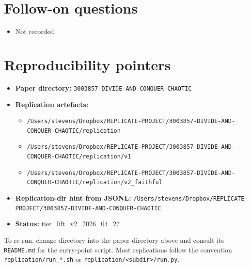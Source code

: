 \documentclass[11pt]{article}
\begin{document}
\section{Follow-on questions}
\begin{itemize}
\item Not recorded.
\end{itemize}

\section{Reproducibility pointers}\label{sec:repro}
\begin{itemize}
\item \textbf{Paper directory:} \texttt{3003857-DIVIDE-AND-CONQUER-CHAOTIC}
\item \textbf{Replication artefacts:}
\begin{itemize}
\item \texttt{/Users/stevens/Dropbox/REPLICATE-PROJECT/3003857-DIVIDE-AND-CONQUER-CHAOTIC/replication}
\item \texttt{/Users/stevens/Dropbox/REPLICATE-PROJECT/3003857-DIVIDE-AND-CONQUER-CHAOTIC/replication/v1}
\item \texttt{/Users/stevens/Dropbox/REPLICATE-PROJECT/3003857-DIVIDE-AND-CONQUER-CHAOTIC/replication/v2\_faithful}
\end{itemize}
\item \textbf{Replication-dir hint from JSONL:} \texttt{/Users/stevens/Dropbox/REPLICATE-PROJECT/3003857-DIVIDE-AND-CONQUER-CHAOTIC}
\item \textbf{Status:} tier\_lift\_v2\_2026\_04\_27
\end{itemize}

To re-run, change directory into the paper directory above and consult its \texttt{README.md} for the entry-point script. Most replications follow the convention \texttt{replication/run\_*.sh} or \texttt{replication/<subdir>/run.py}.
\end{document}
